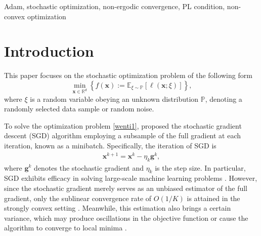 \documentclass[twoside,11pt]{article}
\begin{document}
\begin{keywords}
Adam,  stochastic optimization, non-ergodic convergence, PL condition, non-convex optimization
\end{keywords}

\section{Introduction}
This paper focuses on the stochastic optimization problem of the following form
\begin{equation}\label{wenti1}
\min_{\mathbf{x}\in\mathbb{R}^d}\left\lbrace f(\mathbf{x}):=\mathbb{E}_{\xi\sim \mathbb{P}}[\ell(\mathbf{x};\xi)]\right\rbrace ,
\end{equation}
where $\xi$ is a random variable obeying an unknown distribution $\mathbb{P}$, denoting a randomly selected data sample or random noise. 
\par To solve the optimization problem \eqref{wenti1}, \citet{robbins1951stochastic} proposed the stochastic gradient descent (SGD) algorithm employing a subsample of the full gradient at each iteration, known as a minibatch. Specifically, the iteration of SGD is 
\begin{align}
\mathbf{x}^{k+1}=\mathbf{x}^k-\eta_k\mathbf{g}^k,\nonumber
\end{align} 
where $\mathbf{g}^k$ denotes the stochastic gradient and $\eta_k$ is the step size. In particular, SGD exhibits efficacy in solving large-scale machine learning problems \citep[e.g.,][]{bottou2010large,bottou2018optimization,shen2019deep}. However, since the stochastic gradient merely serves as an unbiased estimator of the full gradient, only the sublinear convergence rate of $O(1/K)$ is attained in the strongly convex setting \citep[see][]{agarwal2009information, rakhlin2012making,luo2022sgd}. Meanwhile, this estimation also brings a certain variance, which may produce oscillations in the objective function \citep{ruder2016overview} or cause the algorithm to converge to local minima \citep{10.5555/2969033.2969154}.
\end{document}
